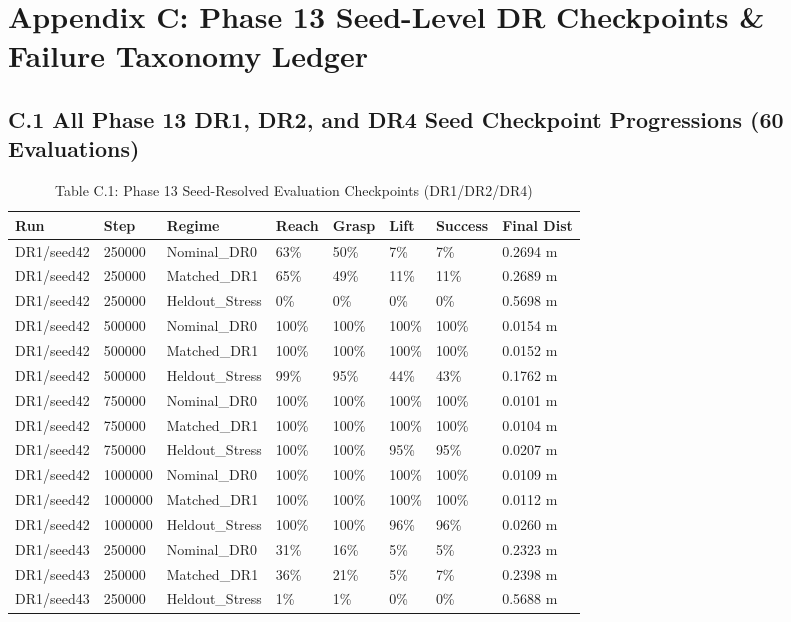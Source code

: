 \documentclass[11pt,a4paper,oneside]{book}
\begin{document}
\chapter{Appendix C: Phase 13 Seed-Level DR Checkpoints \& Failure Taxonomy Ledger}
\section{C.1 All Phase 13 DR1, DR2, and DR4 Seed Checkpoint Progressions (60 Evaluations)}
\begin{longtable}{l l l l l l l l}\caption{Table C.1: Phase 13 Seed-Resolved Evaluation Checkpoints (DR1/DR2/DR4)}\\\toprule
Run & Step & Regime & Reach & Grasp & Lift & Success & Final Dist \\ \midrule \endhead
DR1/seed42 & 250000 & Nominal\_DR0 & 63\% & 50\% & 7\% & 7\% & 0.2694 m \\
DR1/seed42 & 250000 & Matched\_DR1 & 65\% & 49\% & 11\% & 11\% & 0.2689 m \\
DR1/seed42 & 250000 & Heldout\_Stress & 0\% & 0\% & 0\% & 0\% & 0.5698 m \\
DR1/seed42 & 500000 & Nominal\_DR0 & 100\% & 100\% & 100\% & 100\% & 0.0154 m \\
DR1/seed42 & 500000 & Matched\_DR1 & 100\% & 100\% & 100\% & 100\% & 0.0152 m \\
DR1/seed42 & 500000 & Heldout\_Stress & 99\% & 95\% & 44\% & 43\% & 0.1762 m \\
DR1/seed42 & 750000 & Nominal\_DR0 & 100\% & 100\% & 100\% & 100\% & 0.0101 m \\
DR1/seed42 & 750000 & Matched\_DR1 & 100\% & 100\% & 100\% & 100\% & 0.0104 m \\
DR1/seed42 & 750000 & Heldout\_Stress & 100\% & 100\% & 95\% & 95\% & 0.0207 m \\
DR1/seed42 & 1000000 & Nominal\_DR0 & 100\% & 100\% & 100\% & 100\% & 0.0109 m \\
DR1/seed42 & 1000000 & Matched\_DR1 & 100\% & 100\% & 100\% & 100\% & 0.0112 m \\
DR1/seed42 & 1000000 & Heldout\_Stress & 100\% & 100\% & 96\% & 96\% & 0.0260 m \\
DR1/seed43 & 250000 & Nominal\_DR0 & 31\% & 16\% & 5\% & 5\% & 0.2323 m \\
DR1/seed43 & 250000 & Matched\_DR1 & 36\% & 21\% & 5\% & 7\% & 0.2398 m \\
DR1/seed43 & 250000 & Heldout\_Stress & 1\% & 1\% & 0\% & 0\% & 0.5688 m \\

\end{longtable}
\end{document}
